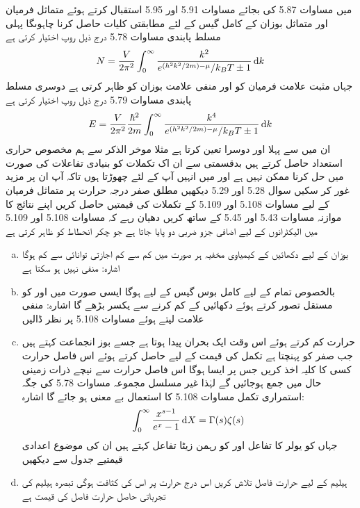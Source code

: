 میں مساوات 5.87 کی بجائے مساوات 5.91 اور 5.95 استقبال کرتے ہوئے متماثل فرمیان اور متماثل بوزان کے کامل گیس کے لئے مطابقتی کلیات حاصل کرنا چاہوںگا پہلی مسلط پابندی مساوات 5.78 درج ذیل روپ اختیار کرتی ہے 
\begin{align}
N = \frac{V}{2 \pi^2} \int_0^{\infty} \frac{k^2}{e^{(h^2 k^2 /2m) - \mu} / k_B T \pm 1} \dif k
\end{align}
جہاں مثبت علامت فرمیان کو اور منفی علامت بوزان کو ظاہر  کرتی ہے دوسری مسلط پابندی مساوات 5.79 درج ذیل روپ اختیار کرتی ہے 
\begin{align}
E = \frac{V}{2\pi^2} \frac{\hslash^2}{2m} \int_0^{\infty} \frac{k^4}{e^{(h^2 k^2 /2m) - \mu} / k_B T \pm 1} \dif k
\end{align}
ان میں سے پہلا  اور دوسرا  تعین کرتا ہے مثلا موخر الذکر سے ہم مخصوص حراری استعداد  حاصل کرتے ہیں بدقسمتی سے ان اک تکملات کو بنیادی تفاعلات کی صورت میں حل کرنا ممکن نہیں ہے اور میں انہیں آپ کے لئے چھوڑتا ہوں تاکہ آپ ان پر مزید غور کر سکیں سوال 5.28 اور 5.29 دیکھیں 
مطلق صفر درجہ حرارت پر متماثل فرميان کے لیے مساوات 5.108 اور 5.109 کے تکملات کی قیمتیں حاصل کریں اپنے نتائج کا موازنہ مساوات 5.43 اور 5.45 کے ساتھ کریں دھیان رہے کہ مساوات 5.108 اور 5.109 میں الیکٹرانوں کے لیے اضافی جزو ضربی دو  پایا جاتا ہے جو چکر انحطاط کو ظاہر کرتی ہے 
\begin{enumerate}[a.]
\item
بوزان کے لیے دکھائیں کے کیمیاوی مخفیہ ہر صورت میں کم سے کم اجازتی توانائی سے کم ہوگا اشارہ:  منفی نہیں ہو سکتا ہے 
\item
بالخصوص تمام  کے لیے کامل بوس گیس کے لیے  ہوگا ایسی صورت میں  اور  کو مستقل تصور کرتے ہوئے دکھائیں کے  کم کرنے سے  یکسر بڑھے گا اشارہ: منفی علامت لیتے ہوئے مساوات 5.108 پر نظر ڈالیں
\item
حرارت  کم کرتے ہوئے اس وقت ایک بحران پیدا ہوتا ہے جسے بوز انجماعت کہتے ہیں جب  صفر کو پہنچتا ہے تکمل کی قیمت  کے لیے حاصل کرتے ہوئے اس فاصل حرارت کسی کا کلیہ اخذ کریں جس پر ایسا ہوگا اس فاصل حرارت سے نیچے ذرات زمینی حال میں جمع ہوجائیں گے لہٰذا غیر مسلسل مجموعہ مساوات 5.78 کی جگہ استمراری تکمل مساوات 5.108 کا استعمال بے معنی ہو جائے گا اشارہ: 
\begin{align} 
\int_0^{\infty} \frac{x^{s - 1}}{e^x - 1} \dif X = \Gamma (s) \zeta(s)
\end{align} 
جہاں  کو يولر کا  تفاعل اور  کو رہمن زیٹا تفاعل کہتے ہیں ان کی موضوع اعدادی قیمتیے جدول سے دیکھیں 
\item
ہیلیم کے لیے حرارت فاصل تلاش کریں اس درج حرارت پر اس کی کثافت  ہوگی تبصرہ ہیلیم کی تجرباتی حاصل حرارت فاصل کی قیمت  ہے 
\end{enumerate}

